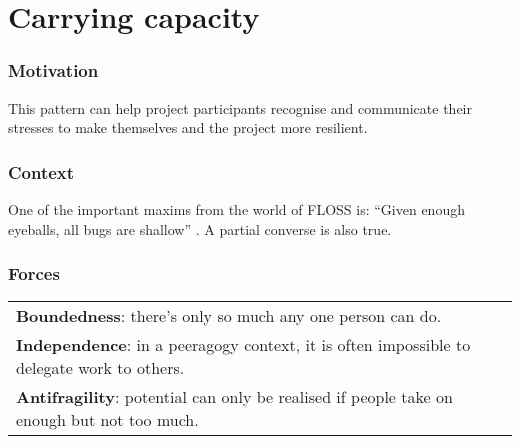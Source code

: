 \section{Carrying capacity}\label{sec:Carrying capacity}

\subsubsection*{Motivation} This pattern can help project participants recognise and communicate their stresses to make themselves and the project  more resilient.



\subsubsection*{Context}

One of the important maxims from the world of FLOSS is:
``Given enough eyeballs, all bugs are shallow'' \cite[p.~30]{raymond2001cathedral}.
A partial converse is also true.

\subsubsection*{Forces}
\raisebox{-2\baselineskip}
{{\centering
\begin{tabular}{p{}}
\textbf{Boundedness}: there's only so much any one person can do.\\
\textbf{Independence}: in a peeragogy context, it is often impossible to delegate work to others.\\
\textbf{Antifragility}: potential can only be realised if people take on enough but not too much.
\end{tabular}
}}

